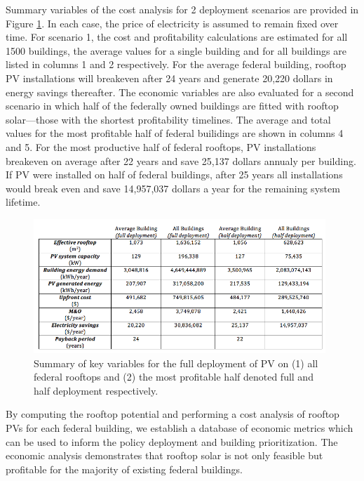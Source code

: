  Summary variables of the cost analysis for 2 deployment scenarios are provided in Figure \ref{fig:rtl_pic2}. In each case, the price of electricity is assumed to remain fixed over time. For scenario 1, the cost and profitability calculations are estimated for all 1500 buildings, the average values for a single building and for all buildings are listed in columns 1 and 2 respectively. For the average federal building, rooftop PV installations will breakeven after 24 years and generate 20,220 dollars in energy savings thereafter.  The economic variables are also evaluated for a second scenario in which half of the federally owned buildings are fitted with rooftop solar---those with the shortest profitability timelines. The average and total values for the most profitable half of federal builidings are shown in columns 4 and 5. For the most productive half of federal rooftops, PV installations breakeven on average after 22 years and save 25,137 dollars annualy per building. If PV were installed on half of federal buildings, after 25 years all installations would break even and save 14,957,037 dollars a year for the remaining system lifetime. 

\begin{figure}
  \centering
    \includegraphics[width=0.98\textwidth]{pics/rtl_pic2}
  \caption{Summary of key variables for the full deployment of PV on (1) all federal rooftops and (2) the most profitable half denoted full and half deployment respectively.}
  \label{fig:rtl_pic2}
\end{figure}

By computing the rooftop potential and performing a cost analysis of rooftop PVs for each federal building, we establish a database of economic metrics which can be used to inform the policy deployment and building prioritization. The economic analysis demonstrates that rooftop solar is not only feasible but profitable for the majority of existing federal buildings.
